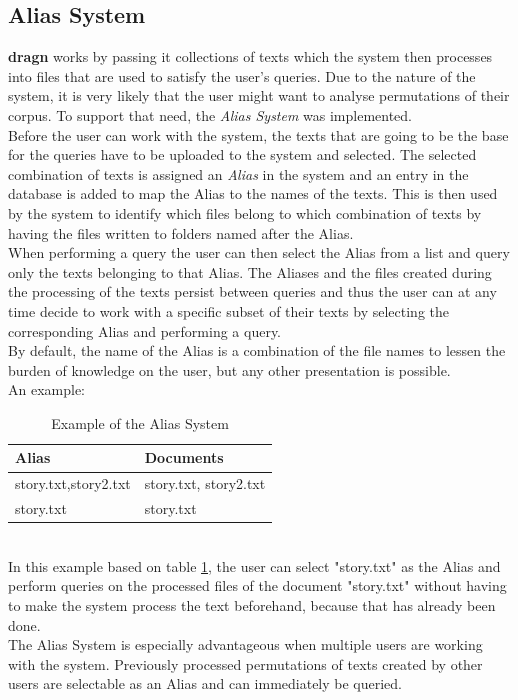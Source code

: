 \subsection{Alias System}
\label{sec:alias}
\textbf{dragn} works by passing it collections of texts which the system then processes into files that are used to satisfy the user's queries. Due to the nature of the system, it is very likely that the user might want to analyse permutations of their corpus. To support that need, the \textit{Alias System} was implemented.\\
Before the user can work with the system, the texts that are going to be the base for the queries have to be uploaded to the system and selected. The selected combination of texts is assigned an \textit{Alias} in the system and an entry in the database is added to map the Alias to the names of the texts. This is then used by the system to identify which files belong to which combination of texts by having the files written to folders named after the Alias.\\
When performing a query the user can then select the Alias from a list and query only the texts belonging to that Alias. The Aliases and the files created during the processing of the texts persist between queries and thus the user can at any time decide to work with a specific subset of their texts by selecting the corresponding Alias and performing a query.\\
By default, the name of the Alias is a combination of the file names to lessen the burden of knowledge on the user, but any other presentation is possible.\\
An example:
\begin{table}[h!]
\centering
\caption{Example of the Alias System}
\label{table:alias-example}
\begin{tabular}{l|l}
Alias & Documents \\ \hline
story.txt,story2.txt & story.txt, story2.txt \\
story.txt & story.txt
\end{tabular}
\end{table}
\\
In this example based on table \ref{table:alias-example}, the user can select "story.txt" as the Alias and perform queries on the processed files of the document "story.txt" without having to make the system process the text beforehand, because that has already been done.\\
The Alias System is especially advantageous when multiple users are working with the system. Previously processed permutations of texts created by other users are selectable as an Alias and can immediately be queried.\\

